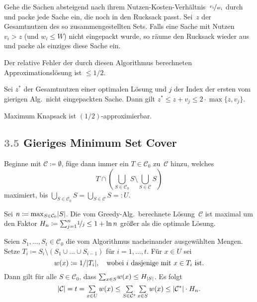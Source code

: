 \documentclass{cheat-sheet}
\newcommand{\size}[1]{\abs{#1}} %
\newcommand{\Problem}[1]{\textcolor{ProblemColor}{\textbf{#1}}}
\newcommand{\scriptSection}[1]{\textcolor{gray}{#1}\enspace}
\begin{document}
\begin{alg}
  Gehe die Sachen absteigend nach ihrem Nutzen-Kosten-Verhältnis~$\nicefrac{v_i}{w_i}$ durch und packe jede Sache ein, die noch in den Rucksack passt.
  Sei~$z$ der Gesamtnutzen des so zusammengestellten Sets.
  Falls eine Sache mit Nutzen $v_i > z$ (und $w_i \leq W$) nicht eingepackt wurde, so räume den Rucksack wieder aus und packe als einziges diese Sache ein.
\end{alg}

\begin{satz}
  Der relative Fehler der durch diesen Algorithmus berechneten Approximationslösung ist $\leq 1/2$.
\end{satz}

\begin{beweisskizze}
  Sei $z^*$ der Gesamtnutzen einer optimalen Lösung und $j$ der Index der ersten vom gierigen Alg.\ nicht eingepackten Sache.
  Dann gilt $z^* \leq z + v_j \leq 2 \cdot \max \{ z, v_j \}$.
\end{beweisskizze}

\begin{kor}
  Maximum Knapsack ist $(1/2)$-approximierbar.
\end{kor}

\subsection{\scriptSection{3.5} Gieriges \Problem{Minimum Set Cover}}

\begin{alg}
  Beginne mit $\mathcal{C} \coloneqq \emptyset$, füge dann immer ein $T \in \mathcal{C}_0$ zu~$\mathcal{C}$ hinzu, welches
  \[ T \cap \left( {\bigcup}_{S \in \mathcal{C}_0} S \setminus {\bigcup}_{S \in \mathcal{C}} S \right) \]
  maximiert, bis ${\bigcup}_{S \in \mathcal{C}_0} S = {\bigcup}_{S \in \mathcal{C}} S =: U$.
\end{alg}

\begin{satz}
  Sei $n \coloneqq {\max}_{S \in \mathcal{C}_0} \size{S}$.
  Die vom Greedy-Alg.\ berechnete Lösung~$\mathcal{C}$ ist maximal um den Faktor $H_n \coloneqq {\sum}_{j=1}^n \nicefrac{1}{j} \leq 1 + \ln n$ größer als die optimale Lösung.
\end{satz}

\begin{beweisskizze}
  Seien $S_1, \ldots, S_t \in \mathcal{C}_0$ die vom Algorithmus nacheinander ausgewählten Mengen.
  Setze $T_i \coloneqq S_i \setminus (S_1 \cup \ldots \cup S_{i-1})$ für $i = 1, \ldots, t$.
  Für $x \in U$ sei
  \[
    w(x) \coloneqq 1/\size{T_i}, \quad
    \text{wobei $i$ dasjenige mit $x \in T_i$ ist.}
  \]
  Dann gilt für alle $S \in \mathcal{C}_0$, dass ${\sum}_{x \in S} w(x) \leq H_{\size{S}}$.
  Es folgt
  \[
    \size{\mathcal{C}} = t = \sum_{x \in U} w(x) \leq \sum_{S \in \mathcal{C}^*} \sum_{x \in S} w(x) \leq \size{\mathcal{C}^*} \cdot H_n.
  \]
\end{beweisskizze}
\end{document}
